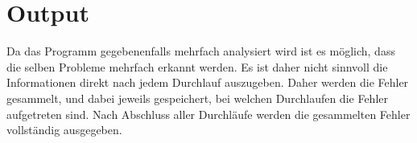 \section{Output}
Da das Programm gegebenenfalls mehrfach analysiert wird ist es möglich, dass 
die selben Probleme mehrfach erkannt werden. Es ist daher nicht sinnvoll 
die Informationen direkt nach jedem Durchlauf auszugeben. Daher werden die 
Fehler gesammelt, und dabei jeweils gespeichert, bei welchen Durchlaufen die 
Fehler aufgetreten sind. Nach Abschluss aller Durchläufe werden die 
gesammelten Fehler vollständig ausgegeben.
